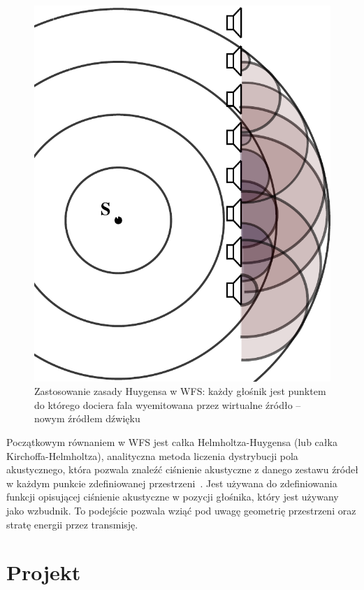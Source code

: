 \documentclass[12pt]{oska}
\begin{document}
\begin{figure}[H]
  \centering
  \includegraphics[scale=.4]{vecgraphics/WFS_idea.pdf}
  \caption{Zastosowanie zasady Huygensa w WFS: każdy głośnik jest punktem do
    którego dociera fala wyemitowana przez wirtualne źródło -- nowym źródłem
  dźwięku}
  \label{r:Huygens}
\end{figure}

Początkowym równaniem w WFS jest całka Helmholtza-Huygensa (lub całka
Kirchoffa-Helmholtza), analityczna metoda liczenia dystrybucji pola
akustycznego, która pozwala znaleźć ciśnienie akustyczne z danego zestawu
źródeł w każdym punkcie zdefiniowanej przestrzeni~\cite{snaka}. Jest używana do
zdefiniowania funkcji opisującej ciśnienie akustyczne w pozycji głośnika, który
jest używany jako wzbudnik. To podejście pozwala wziąć pod uwagę geometrię
przestrzeni oraz stratę energii przez transmisję.

\section{Projekt}
\end{document}
